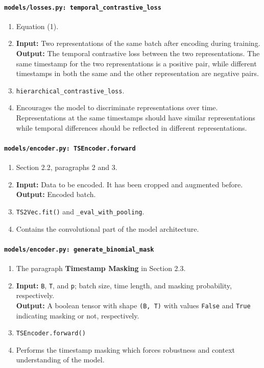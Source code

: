\documentclass[a4paper,11pt]{article}
\newcommand{\code}[1]{\texttt{#1}}
\begin{document}
\paragraph{\code{models/losses.py: temporal\_contrastive\_loss}}
\begin{enumerate}[label=(\roman*)]
\item Equation (1).
\item 
    \textbf{Input:} Two representations of the same batch after encoding during training.\\
    \textbf{Output:} The temporal contrastive loss between the two representations. The same timestamp for the two representations is a positive pair, while different timestamps in both the same and the other representation are negative pairs.
\item \texttt{hierarchical\_contrastive\_loss}.
\item Encourages the model to discriminate representations over time. Representations at the same timestamps should have similar representations while temporal differences should be reflected in different representations.
\end{enumerate}

\paragraph{\code{models/encoder.py: TSEncoder.forward}}
\begin{enumerate}[label=(\roman*)]
\item Section 2.2, paragraphs 2 and 3.
\item 
    \textbf{Input:} Data to be encoded. It has been cropped and augmented before. \\
    \textbf{Output:} Encoded batch.
\item \texttt{TS2Vec.fit()} and \texttt{\_eval\_with\_pooling}.
\item Contains the convolutional part of the model architecture.
\end{enumerate}

\paragraph{\code{models/encoder.py: generate\_binomial\_mask}}
\begin{enumerate}[label=(\roman*)]
\item The paragraph \textbf{Timestamp Masking} in Section 2.3.
\item 
    \textbf{Input:} \texttt{B}, \texttt{T}, and \texttt{p}; batch size, time length, and masking probability, respectively.\\
    \textbf{Output:} A boolean tensor with shape \texttt{(B, T)} with values \texttt{False} and \texttt{True} indicating masking or not, respectively.
\item \texttt{TSEncoder.forward()}
\item Performs the timestamp masking which forces robustness and context understanding of the model.
\end{enumerate}
\end{document}
